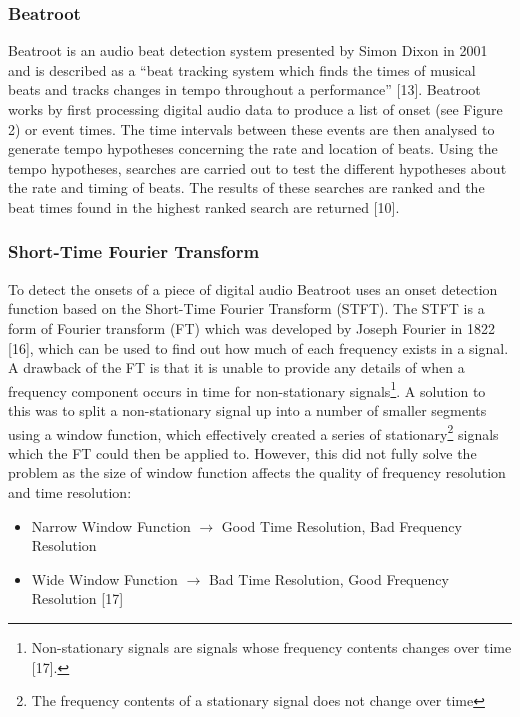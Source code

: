 \documentclass[a4paper, 11pt]{article}
\begin{document}
\subsubsection{Beatroot}
Beatroot is an audio beat detection system presented by Simon Dixon in 2001 and is described as a ``beat tracking system which finds the times of musical beats and tracks changes in tempo throughout a performance'' [13]. Beatroot works by first processing digital audio data to produce a list of onset (see Figure 2) or event times. The time intervals between these events are then analysed to generate tempo hypotheses concerning the rate and location of beats. Using the tempo hypotheses, searches are carried out to test the different hypotheses about the rate and timing of beats. The results of these searches are ranked and the beat times found in the highest ranked search are returned [10]. 




\subsubsection{Short-Time Fourier Transform}
To detect the onsets of a piece of digital audio Beatroot uses an onset detection function based on the Short-Time Fourier Transform (STFT). The STFT is a form of Fourier transform (FT) which was developed by Joseph Fourier in 1822 [16], which can be used to find out how much of each frequency exists in a signal. A drawback of the FT is that it is unable to provide any details of when a frequency component occurs in time for non-stationary signals\footnote{Non-stationary signals are signals whose frequency contents changes over time [17].}. A solution to this was to split a non-stationary signal up into a number of smaller segments using a window function, which effectively created a series of stationary\footnote{The frequency contents of a stationary signal does not change over time} signals which the FT could then be applied to. However, this did not fully solve the problem as the size of window function affects the quality of frequency resolution and time resolution:
\begin{itemize}
\item Narrow Window Function $\longrightarrow$  Good Time Resolution, Bad Frequency Resolution
\item Wide Window Function $\longrightarrow$  Bad Time Resolution, Good Frequency Resolution [17]
\end{itemize}
\end{document}
